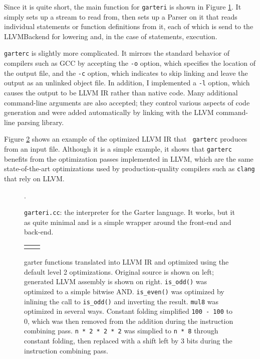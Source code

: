\documentclass[11pt]{article}
\begin{document}
Since it is quite short, the main function for {\tt garteri} is shown in Figure
\ref{fig:garteri}.  It simply sets up a stream to read from, then sets up a
Parser on it that reads individual statements or function definitions from it,
each of which is send to the LLVMBackend for lowering and, in the case of
statements, execution.

{\tt garterc} is slightly more complicated.  It mirrors the standard behavior of
compilers such as GCC by accepting the {\tt -o} option, which specifies the
location of the output file, and the {\tt -c} option, which indicates to skip
linking and leave the output as an unlinked object file.  In addition, I
implemented a {\tt -l} option, which causes the output to be LLVM IR rather than
native code.  Many additional command-line arguments are also accepted; they
control various aspects of code generation and were added automatically by
linking with the LLVM command-line parsing library.

Figure \ref{fig:test} shows an example of the optimized LLVM IR that {\tt
garterc} produces from an input file.  Although it is a simple example, it shows
that {\tt garterc} benefits from the optimization passes implemented in LLVM,
which are the same state-of-the-art optimizations used by production-quality
compilers such as {\tt clang} that rely on LLVM.

\begin{figure}
    \lstset{language=C++}
    \lstset{numbers=left}
    
    \caption{{\tt garteri.cc}:  the interpreter for the Garter language.  It
        works, but it as quite minimal and is a simple wrapper around the
        front-end and back-end.}
    \label{fig:garteri}.
\end{figure}

\begin{figure}
    \begin{tabular}{p{7cm}p{9cm}}
        
        &
        
    \end{tabular}
    \caption{garter functions translated into LLVM IR and optimized using the
            default level 2 optimizations.  Original source is shown on left;
            generated LLVM assembly is shown on right.
        {\tt is\_odd()} was optimized to a simple bitwise AND.
        {\tt is\_even()} was optimized by inlining the call to {\tt is\_odd()}
        and inverting the result.  {\tt mul8} was optimized in several ways.
        Constant folding simplified {\tt 100 - 100} to 0, which was then
        removed from the addition during the instruction combining pass.  {\tt n
        * 2 * 2 * 2} was simplied to {\tt n * 8} through constant folding, then
        replaced with a shift left by 3 bits during the instruction combining
        pass.
    }
    \label{fig:test}
\end{figure}
\end{document}
